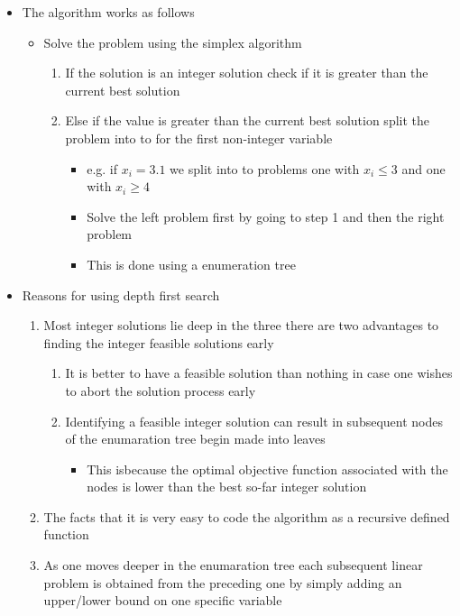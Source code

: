 \documentclass[11pt]{article}
\begin{document}
\begin{itemize}
\item The algorithm works as follows
\begin{itemize}
\item Solve the problem using the simplex algorithm
\begin{enumerate}
\item If the solution is an integer solution check if it is greater than the current best solution
\item Else if the value is greater than the current best solution split the problem into to for the first non-integer variable
\begin{itemize}
\item e.g. if \(x_i = 3.1\) we split into to problems one with \(x_i \leq 3\) and one with \(x_i \geq 4\)
\item Solve the left problem first by going to step 1 and then the right problem
\item This is done using a enumeration tree
\end{itemize}
\end{enumerate}
\end{itemize}

\item Reasons for using depth first search
\begin{enumerate}
\item Most integer solutions lie deep in the three there are two advantages to finding the integer feasible solutions early 
\begin{enumerate}
\item It is better to have a feasible solution than nothing in case one wishes to abort the solution process early
\item Identifying a feasible integer solution can result in subsequent nodes of the enumaration tree begin made into leaves
\begin{itemize}
\item This isbecause the optimal objective function associated with the nodes is lower than the best so-far integer solution
\end{itemize}
\end{enumerate}
\item The facts that it is very easy to code the algorithm as a recursive defined function
\item As one moves deeper in the enumaration tree each subsequent linear problem is obtained from the preceding one by simply adding an upper/lower bound on one specific variable
\end{enumerate}
\end{itemize}
\end{document}
